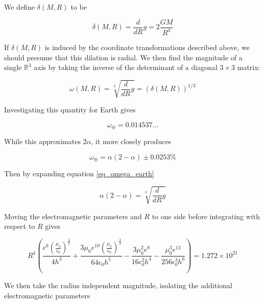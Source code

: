 \documentclass[pdflatex,sn-mathphys-num]{sn-jnl}%
\theoremstyle{thmstyleone}%
\theoremstyle{thmstyletwo}%
\theoremstyle{thmstylethree}%
\begin{document}
\begin{appendices}
We define $\delta\left( M, R \right)$ to be

\begin{equation}
    \delta\left( M, R \right) = \frac{d}{dR} g = 2 \frac{GM}{R^{3}}
\end{equation}

If $\delta\left( M, R \right)$ is induced by the coordinate transformations described above, we should presume that this dilation is radial. We then find the magnitude of a single $\mathbb{R}^{3}$ axis by taking the inverse of the determinant of a diagonal $3 \times 3$ matrix:

\begin{equation}
    \omega\left( M, R \right) = \sqrt[3]{\frac{d}{dR} g} = \left(\delta\left( M, R \right)\right)^{1/3}
\end{equation}


Investigating this quantity for Earth gives

\begin{equation}
    \omega_{\oplus} = 0.014537\dots
\end{equation}

While this approximates $2 \alpha$, it more closely produces

\begin{equation}\label{eq_omega_earth}
    \omega_{\oplus} = \alpha \left( 2 - \alpha \right) \pm 0.0253\%
\end{equation}

Then by expanding equation \ref{eq_omega_earth}

\begin{equation}\label{eq_omega_earth_Gamma}
    \alpha \left( 2 - \alpha \right) = \sqrt[3]{\frac{d}{dR}g}
\end{equation}

Moving the electromagnetic parameters and $R$ to one side before integrating with respect to $R$ gives


\begin{equation}
    R^{4} \left(\frac{e^{6} \left(\frac{\mu_{0}}{\epsilon_{0}}\right)^{\frac{3}{2}}}{4 h^{3}} + \frac{3 \mu_{0} e^{10} \left(\frac{\mu_{0}}{\epsilon_{0}}\right)^{\frac{3}{2}}}{64 \epsilon_{0} h^{5}} - \frac{3 \mu_{0}^{2} e^{8}}{16 \epsilon_{0}^{2} h^{4}} - \frac{\mu_{0}^{3} e^{12}}{256 \epsilon_{0}^{3} h^{6}}\right) = 1.272 \times 10^{21}
\end{equation}

We then take the radius independent magnitude, isolating the additional electromagnetic parameters


\end{appendices}
\end{document}
